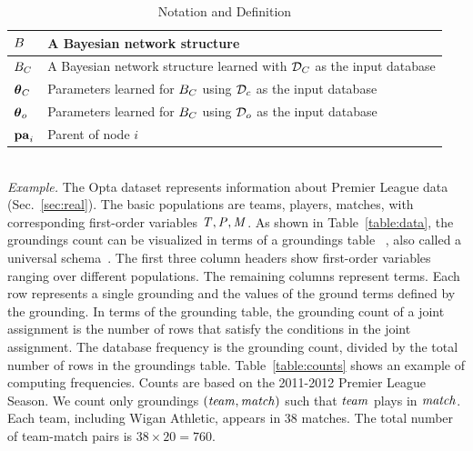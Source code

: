 {{\begin{table}
{\begin{tabular}{|l|l|}
 	 	      			$B$&A Bayesian network structure\\\hline
 	 	      			$B_{C}$ & A Bayesian network structure learned with $\mathcal{D}_{C}$ as the input database\\\hline
 	 	      			$\boldsymbol{\theta}_{C}$ & Parameters learned for $B_{C}$ using $\mathcal{D}_{c}$  as the input database\\\hline
 	 	      			$\boldsymbol{\theta}_{o}$ & Parameters learned for $B_{C}$ using $\mathcal{D}_{o}$  as the input database\\\hline
 	 	      			$\mathbf{pa}_{i}$&Parent of node $i$\\\hline
 	 	      		\end{tabular}} 	\caption[Table of Notations]{Notation and Definition	\label{table:notation}}
 	 	      	\end{table}\\
\emph{Example.} \label{sec:example}
%
The Opta dataset represents information about Premier League data %
(Sec.~\ref{sec:real}). 
The basic populations are teams, players, matches, with 
corresponding first-order variables $\it{T}, \it{P}, \it{M}$. As shown in Table~\ref{table:data}, the groundings count can be visualized in terms of a groundings table ~\citep{Schulte2012}, also called a universal schema~\citep{Riedel2013}. 
The first three column headers show first-order variables ranging over different populations. The remaining columns represent terms. Each row represents a single grounding and the values of the ground terms defined by the grounding.
In terms of the grounding table, the grounding count of a joint assignment is the number of rows that satisfy the conditions in the joint assignment. The database frequency is the grounding count, divided by the total number of rows in the groundings table. Table~\ref{table:counts} shows an example of computing frequencies. Counts are based on the 2011-2012 Premier League Season. We count only groundings $(\it{team},\it{match})$ such that $\it{team}$ plays in $\it{match}$. Each team, including Wigan Athletic, appears in 38 matches. The total number of team-match pairs is $38 \times 20 = 760$.

}}
